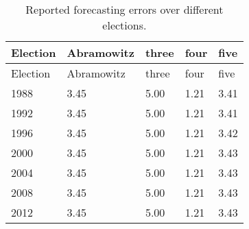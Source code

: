 \documentclass[
  12pt]{article}
\begin{document}
\hypertarget{tbl-one}{}
\begin{longtable}[]{@{}lllll@{}}
\caption{\label{tbl-one}Reported forecasting errors over different
elections.}\tabularnewline
\toprule()
Election & Abramowitz & three & four & five \\
\midrule()
\endfirsthead
\toprule()
Election & Abramowitz & three & four & five \\
\midrule()
\endhead
1988 & 3.45 & 5.00 & 1.21 & 3.41 \\
1992 & 3.45 & 5.00 & 1.21 & 3.41 \\
1996 & 3.45 & 5.00 & 1.21 & 3.42 \\
2000 & 3.45 & 5.00 & 1.21 & 3.43 \\
2004 & 3.45 & 5.00 & 1.21 & 3.43 \\
2008 & 3.45 & 5.00 & 1.21 & 3.43 \\
2012 & 3.45 & 5.00 & 1.21 & 3.43 \\
\bottomrule()
\end{longtable}

\addtolength{\textheight}{.5in}%

\addtolength{\textheight}{-.5in}%


  
\end{document}

